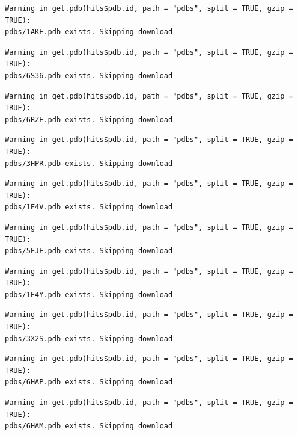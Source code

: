 \documentclass[
  letterpaper,
  DIV=11,
  numbers=noendperiod]{scrartcl}
\begin{document}
\begin{verbatim}
Warning in get.pdb(hits$pdb.id, path = "pdbs", split = TRUE, gzip = TRUE):
pdbs/1AKE.pdb exists. Skipping download
\end{verbatim}

\begin{verbatim}
Warning in get.pdb(hits$pdb.id, path = "pdbs", split = TRUE, gzip = TRUE):
pdbs/6S36.pdb exists. Skipping download
\end{verbatim}

\begin{verbatim}
Warning in get.pdb(hits$pdb.id, path = "pdbs", split = TRUE, gzip = TRUE):
pdbs/6RZE.pdb exists. Skipping download
\end{verbatim}

\begin{verbatim}
Warning in get.pdb(hits$pdb.id, path = "pdbs", split = TRUE, gzip = TRUE):
pdbs/3HPR.pdb exists. Skipping download
\end{verbatim}

\begin{verbatim}
Warning in get.pdb(hits$pdb.id, path = "pdbs", split = TRUE, gzip = TRUE):
pdbs/1E4V.pdb exists. Skipping download
\end{verbatim}

\begin{verbatim}
Warning in get.pdb(hits$pdb.id, path = "pdbs", split = TRUE, gzip = TRUE):
pdbs/5EJE.pdb exists. Skipping download
\end{verbatim}

\begin{verbatim}
Warning in get.pdb(hits$pdb.id, path = "pdbs", split = TRUE, gzip = TRUE):
pdbs/1E4Y.pdb exists. Skipping download
\end{verbatim}

\begin{verbatim}
Warning in get.pdb(hits$pdb.id, path = "pdbs", split = TRUE, gzip = TRUE):
pdbs/3X2S.pdb exists. Skipping download
\end{verbatim}

\begin{verbatim}
Warning in get.pdb(hits$pdb.id, path = "pdbs", split = TRUE, gzip = TRUE):
pdbs/6HAP.pdb exists. Skipping download
\end{verbatim}

\begin{verbatim}
Warning in get.pdb(hits$pdb.id, path = "pdbs", split = TRUE, gzip = TRUE):
pdbs/6HAM.pdb exists. Skipping download
\end{verbatim}
\end{document}
